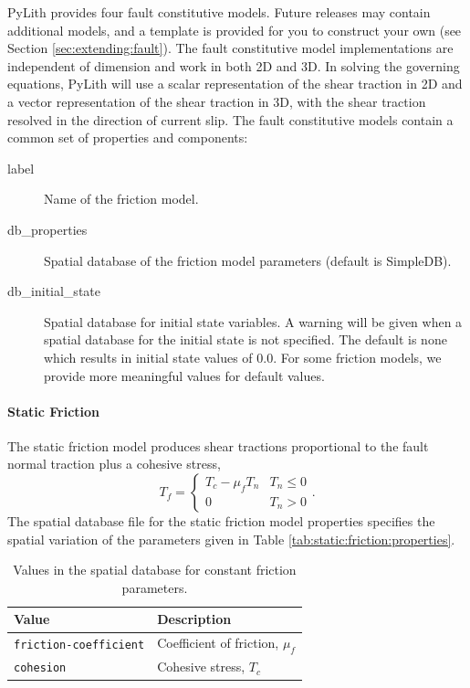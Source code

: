 PyLith provides four fault constitutive models. Future releases may
contain additional models, and a template is provided for you to construct
your own (see Section \vref{sec:extending:fault}).
The fault constitutive model implementations are independent of dimension
and work in both 2D and 3D. In solving the governing equations, PyLith
will use a scalar representation of the shear traction in 2D and a
vector representation of the shear traction in 3D, with the shear
traction resolved in the direction of current slip. The fault constitutive
models contain a common set of properties and components:
\begin{description}
\item [{label}] Name of the friction model.
\item [{db\_properties}] Spatial database of the friction model parameters
(default is SimpleDB).
\item [{db\_initial\_state}] Spatial database for initial state variables.
A warning will be given when a spatial database for the initial state
is not specified. The default is none which results in initial state
values of 0.0. For some friction models, we provide more meaningful
values for default values.
\end{description}

\paragraph{Static Friction}

The static friction model produces shear tractions proportional to
the fault normal traction plus a cohesive stress,
\begin{equation}
T_{f}=\begin{cases}
T_{c}-\mu_{f}T_{n} & T_{n}\leq0\\
0 & T_{n}>0
\end{cases}.
\end{equation}
The spatial database file for the static friction model properties
specifies the spatial variation of the parameters given in Table \vref{tab:static:friction:properties}.

\begin{table}[htbp]
\caption{Values in the spatial database for constant friction parameters.}
\label{tab:static:friction:properties}
\begin{tabular}{lp{2.5in}}
\textbf{Value} & \textbf{Description}\\
\hline 
\texttt{friction-coefficient} & Coefficient of friction, $\mu_{f}$\\
\texttt{cohesion} & Cohesive stress, $T_{c}$\\
\hline 
\end{tabular}
\end{table}


